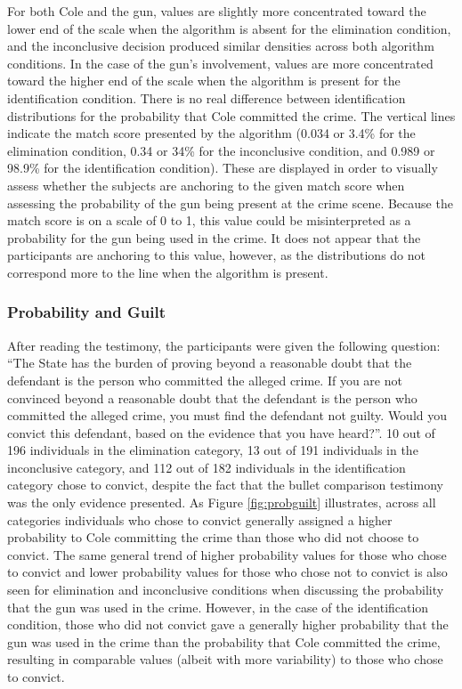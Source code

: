 \documentclass[print]{nuthesis}
\begin{document}
For both Cole and the gun, values are slightly more concentrated toward the lower end of the scale when the algorithm is absent for the elimination condition, and the inconclusive decision produced similar densities across both algorithm conditions.
In the case of the gun's involvement, values are more concentrated toward the higher end of the scale when the algorithm is present for the identification condition.
There is no real difference between identification distributions for the probability that Cole committed the crime.
The vertical lines indicate the match score presented by the algorithm (0.034 or 3.4\% for the elimination condition, 0.34 or 34\% for the inconclusive condition, and 0.989 or 98.9\% for the identification condition).
These are displayed in order to visually assess whether the subjects are anchoring to the given match score when assessing the probability of the gun being present at the crime scene.
Because the match score is on a scale of 0 to 1, this value could be misinterpreted as a probability for the gun being used in the crime.
It does not appear that the participants are anchoring to this value, however, as the distributions do not correspond more to the line when the algorithm is present.

\hypertarget{probability-and-guilt}{%
\subsubsection{Probability and Guilt}\label{probability-and-guilt}}

After reading the testimony, the participants were given the following question:
``The State has the burden of proving beyond a reasonable doubt that the defendant is the person who committed the alleged crime.
If you are not convinced beyond a reasonable doubt that the defendant is the person who committed the alleged crime, you must find the defendant not guilty.
Would you convict this defendant, based on the evidence that you have heard?''.
10 out of 196 individuals in the elimination category, 13 out of 191 individuals in the inconclusive category, and 112 out of 182 individuals in the identification category chose to convict, despite the fact that the bullet comparison testimony was the only evidence presented.
As Figure \ref{fig:probguilt} illustrates, across all categories individuals who chose to convict generally assigned a higher probability to Cole committing the crime than those who did not choose to convict.
The same general trend of higher probability values for those who chose to convict and lower probability values for those who chose not to convict is also seen for elimination and inconclusive conditions when discussing the probability that the gun was used in the crime.
However, in the case of the identification condition, those who did not convict gave a generally higher probability that the gun was used in the crime than the probability that Cole committed the crime, resulting in comparable values (albeit with more variability) to those who chose to convict.
\end{document}
